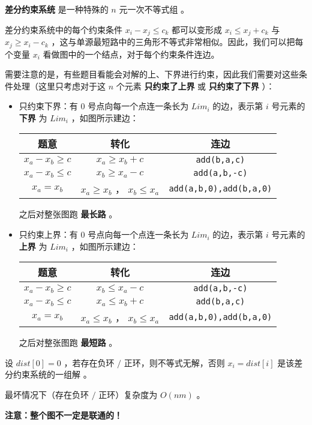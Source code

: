 \textbf{差分约束系统} 是一种特殊的 $n$ 元一次不等式组 。

差分约束系统中的每个约束条件 $x_i-x_j\le c_k$ 都可以变形成 $x_i\le x_j+c_k$ 与 $x_j\ge x_i-c_k$ ，这与单源最短路中的三角形不等式非常相似。因此，我们可以把每个变量 $x_i$ 看做图中的一个结点，对于每个约束条件连边。

需要注意的是，有些题目看能会对解的上、下界进行约束，因此我们需要对这些条件处理（这里只考虑对于这 $n$ 个元素 \textbf{只约束了上界} 或 \textbf{只约束了下界} ）：

\begin{itemize}
    \item 只约束下界：有 $0$ 号点向每一个点连一条长为 $Lim_i$ 的边，表示第 $i$ 号元素的 \textbf{下界} 为 $Lim_i$ ，如图所示建边：
    \begin{center}
        \begin{tabular}{|c|c|c|}
            \hline
            题意 & 转化 & 连边 \\
            \hline
            $x_a-x_b\ge c$ & $x_a\ge x_b+c$ & \texttt{add(b,a,c)} \\
            $x_a-x_b\le c$ & $x_b\ge x_a-c$ & \texttt{add(a,b,-c)} \\
            $x_a=x_b$ & $x_a\ge x_b$ ， $x_b\le x_a$ & \texttt{add(a,b,0),add(b,a,0)} \\
            \hline
        \end{tabular}
    \end{center}
    之后对整张图跑 \textbf{最长路} 。
    \item 只约束上界：有 $0$ 号点向每一个点连一条长为 $Lim_i$ 的边，表示第 $i$ 号元素的 \textbf{上界} 为 $Lim_i$ ，如图所示建边：
    \begin{center}
        \begin{tabular}{|c|c|c|}
            \hline
            题意 & 转化 & 连边 \\
            \hline
            $x_a-x_b\ge c$ & $x_b\le x_a-c$ & \texttt{add(a,b,-c)} \\
            $x_a-x_b\le c$ & $x_a\le x_b+c$ & \texttt{add(b,a,c)} \\
            $x_a=x_b$ & $x_a\le x_b$ ， $x_b\le x_a$ & \texttt{add(a,b,0),add(b,a,0)} \\
            \hline
        \end{tabular}
    \end{center}
    之后对整张图跑 \textbf{最短路} 。
\end{itemize}

设 $dist[0]=0$ ，若存在负环 $/$ 正环，则不等式无解，否则 $x_i=dist[i]$ 是该差分约束系统的一组解 。

最坏情况下（存在负环 $/$ 正环）复杂度为 $O(nm)$ 。

\textbf{注意：整个图不一定是联通的！} 